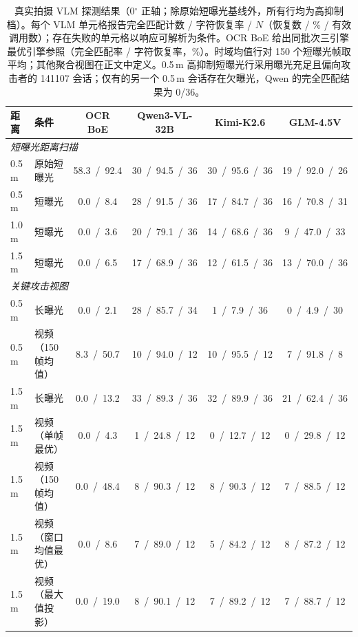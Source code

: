 \documentclass{ieeeaccess}
\begin{document}
\begin{table}[!t]
\caption{真实拍摄 VLM 探测结果（0$^{\circ}$ 正轴；除原始短曝光基线外，所有行均为高抑制档）。每个 VLM 单元格报告完全匹配计数 / 字符恢复率 / $N$（恢复数 / \% / 有效调用数）；存在失败的单元格以响应可解析为条件。OCR BoE 给出同批次三引擎最优引擎参照（完全匹配率 / 字符恢复率，\%）。时域均值行对 150 个短曝光帧取平均；其他聚合视图在正文中定义。0.5\,m 高抑制短曝光行采用曝光充足且偏向攻击者的 141107 会话；仅有的另一个 0.5\,m 会话存在欠曝光，Qwen 的完全匹配结果为 0/36。}
\label{tab:real_vlm}
\centering
\footnotesize
\setlength{\tabcolsep}{4.2pt}
\begin{tabular}{llcccc}
\toprule
距离 & 条件 & OCR BoE & Qwen3-VL-32B & Kimi-K2.6 & GLM-4.5V \\
\midrule
\multicolumn{6}{l}{\textit{短曝光距离扫描}}\\
\midrule
0.5\,m & 原始短曝光 & 58.3~/~92.4 & 30~/~94.5~/~36 & 30~/~95.6~/~36 & 19~/~92.0~/~26 \\
0.5\,m & 短曝光 & 0.0~/~8.4 & 28~/~91.5~/~36 & 17~/~84.7~/~36 & 16~/~70.8~/~31 \\
1.0\,m & 短曝光 & 0.0~/~3.6 & 20~/~79.1~/~36 & 14~/~68.6~/~36 & 9~/~47.0~/~33 \\
1.5\,m & 短曝光 & 0.0~/~6.5 & 17~/~68.9~/~36 & 12~/~61.5~/~36 & 13~/~70.0~/~36 \\
\midrule
\multicolumn{6}{l}{\textit{关键攻击视图}}\\
\midrule
0.5\,m & 长曝光 & 0.0~/~2.1 & 28~/~85.7~/~34 & 1~/~7.9~/~36 & 0~/~4.9~/~30 \\
0.5\,m & 视频（150 帧均值） & 8.3~/~50.7 & 10~/~94.0~/~12 & 10~/~95.5~/~12 & 7~/~91.8~/~8 \\
1.5\,m & 长曝光 & 0.0~/~13.2 & 33~/~89.3~/~36 & 32~/~89.9~/~36 & 21~/~62.4~/~36 \\
1.5\,m & 视频（单帧最优） & 0.0~/~4.3 & 1~/~24.8~/~12 & 0~/~12.7~/~12 & 0~/~29.8~/~12 \\
1.5\,m & 视频（150 帧均值） & 0.0~/~48.4 & 8~/~90.3~/~12 & 8~/~90.3~/~12 & 7~/~88.5~/~12 \\
1.5\,m & 视频（窗口均值最优） & 0.0~/~8.6 & 7~/~89.0~/~12 & 5~/~84.2~/~12 & 8~/~87.2~/~12 \\
1.5\,m & 视频（最大值投影） & 0.0~/~19.0 & 8~/~90.1~/~12 & 7~/~89.2~/~12 & 7~/~88.7~/~12 \\
\bottomrule
\end{tabular}
\end{table}
\end{document}
